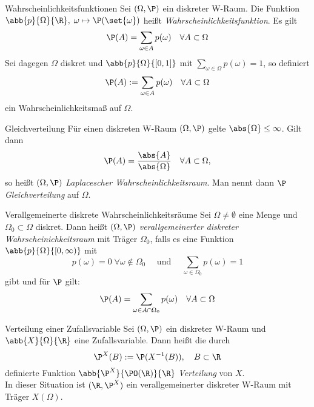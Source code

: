\begin{karte}{Wahrscheinlichkeitsfunktionen}
	Sei $(\Omega, \P)$ ein diskreter W-Raum. Die Funktion $\abb{p}{\Omega}{\R},\; \omega \mapsto \P(\set{\omega})$ heißt \textit{Wahrscheinlichkeitsfunktion}. Es gilt
	$$ \P(A) = \sum_{\omega \in A} p(\omega) \quad \forall A \subset \Omega$$
	Sei dagegen $\Omega$ diskret und $\abb{p}{\Omega}{[0,1]}$ mit $\displaystyle \sum_{\omega \in \Omega} p(\omega) = 1$, so definiert
	$$ \P(A) := \sum_{\omega \in A} p(\omega) \quad \forall A \subset \Omega$$ ein Wahrscheinlichkeitsmaß auf $\Omega$.
\end{karte}

\begin{karte}{Gleichverteilung}
	Für einen diskreten W-Raum $(\Omega,\P)$ gelte $\abs{\Omega} \le \infty$. Gilt dann $$\P(A) = \frac{\abs{A}}{\abs{\Omega}} \quad \forall A \subset \Omega \text{,}$$ so heißt $(\Omega,\P)$ \textit{Laplacescher Wahrscheinlichkeitsraum}. Man nennt dann $\P$ \textit{Gleichverteilung} auf $\Omega$.
\end{karte}

\begin{karte}{Verallgemeinerte diskrete Wahrscheinlichkeitsräume}
	Sei $\Omega \neq \emptyset$ eine Menge und $\Omega_0 \subset \Omega$ diskret. Dann heißt $(\Omega,\P)$ \textit{verallgemeinerter diskreter Wahrscheinichkeitsraum} mit Träger $\Omega_0$, falls es eine Funktion $\abb{p}{\Omega}{[0,\infty)}$ mit 
	$$p(\omega)=0 \; \forall \omega \notin \Omega_0 \quad \text{ und } \quad \sum_{\omega \in \Omega_0} p(\omega) =1$$
	gibt und für $\P$ gilt:
	$$\P(A)=\sum_{\omega \in A \cap \Omega_0} p(\omega) \quad \forall A \subset \Omega$$
\end{karte}

\begin{karte}{Verteilung einer Zufallsvariable}
	Sei $(\Omega,\P)$ ein diskreter W-Raum und $\abb{X}{\Omega}{\R}$ eine Zufallsvariable. Dann heißt die durch
	$$\P^X(B):=\P(X^{-1}(B)), \quad B \subset \R$$ definierte Funktion $\abb{\P^X}{\PO(\R)}{\R}$ \textit{Verteilung} von $X$. \\
	In dieser Situation ist $(\R,\P^X)$ ein verallgemeinerter diskreter W-Raum mit Träger $X(\Omega)$.
\end{karte}
